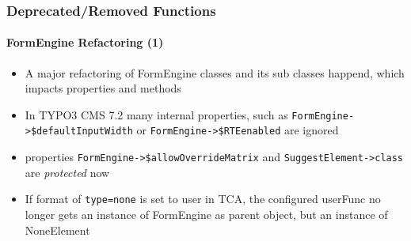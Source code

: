 %

\begin{frame}[fragile]
	\frametitle{Deprecated/Removed Functions}
	\framesubtitle{FormEngine Refactoring (1)}

	\begin{itemize}

		\item A major refactoring of FormEngine classes and its sub classes
			happend, which impacts properties and methods

		\item In TYPO3 CMS 7.2 many internal properties, such as
			\small\texttt{FormEngine->\$defaultInputWidth}\normalsize\space
			or
			\small\texttt{FormEngine->\$RTEenabled}\normalsize\space\newline
			are ignored

		\item properties
			\small\texttt{FormEngine->\$allowOverrideMatrix}\normalsize\space
			and
			\small\texttt{SuggestElement->class}\normalsize\space
			are \textit{protected} now

		\item If format of \texttt{type=none} is set to user in TCA, the configured
			userFunc no longer gets an instance of FormEngine as parent object,
			but an instance of NoneElement

	\end{itemize}

\end{frame}


